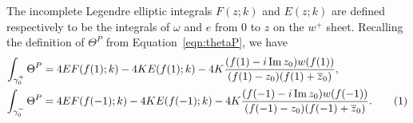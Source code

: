 \documentclass{article}
\numberwithin{equation}{section}
\numberwithin{figure}{section}
\newcommand{\labelthis}[1]{\addtocounter{equation}{1}\tag{\theequation}\label{#1}}
\renewcommand*{\bar}{\overline}
\newcommand{\abs}[1]{\left|#1\right|}
\DeclareMathOperator{\Imag}{Im}
\newcommand{\iu}{i}
\begin{document}
The incomplete Legendre elliptic integrals $F(z;k)$ and $E(z;k)$ are defined respectively to be the integrals of $\omega$ and $e$ from $0$ to $z$ on the $w^+$ sheet. Recalling the definition of $\Theta^P$ from Equation~\eqref{eqn:thetaP}, we have
\begin{align*}
\int_{\gamma_0^+} \Theta^P
&= 4 E F(f(1);k) - 4 K E(f(1);k) - 4K \frac{(f(1)-\iu\Imag z_0)w(f(1))}{(f(1)-z_0)(f(1) + \bar{z}_0)}, \\
\int_{\gamma_0^-} \Theta^P
&= 4 E F(f(-1);k) - 4 K E(f(-1);k) 
- 4K \frac{(f(-1)-\iu\Imag z_0)w(f(-1))}{(f(-1)-z_0)(f(-1) + \bar{z}_0)}.\labelthis{eqn:thetaPformulae}   
\end{align*}














\end{document}
